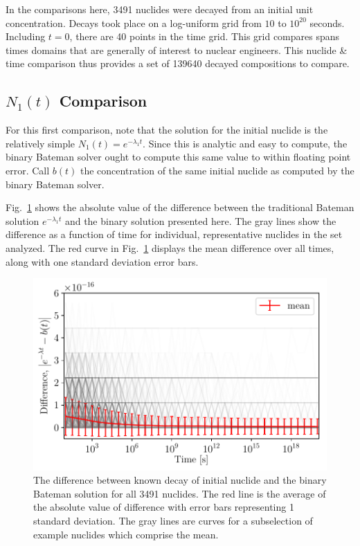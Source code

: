 \documentclass[letterpaper]{physor2018}
\begin{document}
In the comparisons here, 3491 nuclides were decayed from an initial unit
concentration. Decays took place on a log-uniform grid from $10$ to $10^{20}$
seconds. Including $t=0$, there are 40 points in the time grid. This grid
compares spans times domains that are generally of interest to nuclear
engineers. This nuclide \& time comparison thus provides a set of 139640
decayed compositions to compare.

\subsection{$N_1(t)$ Comparison}
\label{subsec-n1}
For this first comparison, note that the solution for the initial nuclide is
the relatively simple $N_1(t) = e^{-\lambda_1 t}$. Since this is analytic and
easy to compute, the binary Bateman solver ought to compute this same
value to within floating point error.  Call $b(t)$ the concentration of the
same initial nuclide as computed by the binary Bateman solver.

Fig.~\ref{fig-n1} shows the absolute value of the difference between
the traditional Bateman solution $e^{-\lambda_1 t}$ and the binary
solution presented here. The gray lines show the difference as a function
of time for individual, representative nuclides in the set analyzed.
The red curve in Fig.~\ref{fig-n1} displays the mean difference over all
times, along with one standard deviation error bars.

\begin{figure}[!htb]
  \centering
  \includegraphics[scale=0.80]{./n1-diff.pdf}
  \caption{The difference between known decay of initial nuclide and the
           binary Bateman solution for all 3491 nuclides. The red line
           is the average of the absolute value of difference with
           error bars representing 1 standard deviation. The gray lines
           are curves for a subselection of example nuclides which comprise
           the mean.}
  \label{fig-n1}
\end{figure}
\end{document}
